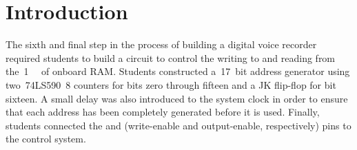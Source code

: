 \section{Introduction}

The sixth and final step in the process of building a digital voice recorder
required students to build a circuit to control the writing to and reading from
the~\SI{1}{\mega\byte} of onboard RAM.  Students constructed a~\SI{17}{bit}
address generator using two~74LS590~\SI{8}{\bit} counters for bits zero through
fifteen and a JK flip-flop for bit sixteen.  A small delay was also introduced
to the system clock in order to ensure that each address has been completely
generated before it is used.  Finally, students connected the  and
 (write-enable and output-enable, respectively) pins to the control
system.
